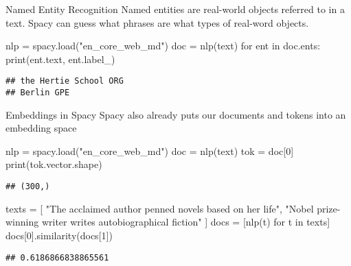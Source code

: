 \documentclass[
  10pt,
  ignorenonframetext,
  aspectratio=169]{beamer}
\newenvironment{Shaded}{\begin{snugshade}}{\end{snugshade}}
\newcommand{\BuiltInTok}[1]{\textcolor[rgb]{0.80,0.80,0.80}{#1}}
\newcommand{\ControlFlowTok}[1]{\textcolor[rgb]{0.94,0.87,0.69}{#1}}
\newcommand{\DecValTok}[1]{\textcolor[rgb]{0.86,0.86,0.80}{#1}}
\newcommand{\KeywordTok}[1]{\textcolor[rgb]{0.94,0.87,0.69}{#1}}
\newcommand{\NormalTok}[1]{\textcolor[rgb]{0.80,0.80,0.80}{#1}}
\newcommand{\OperatorTok}[1]{\textcolor[rgb]{0.94,0.94,0.82}{#1}}
\newcommand{\StringTok}[1]{\textcolor[rgb]{0.80,0.58,0.58}{#1}}
\begin{document}
\begin{frame}[fragile]{Named Entity Recognition}
\protect\hypertarget{named-entity-recognition}{}
Named entities are real-world objects referred to in a text. Spacy can
guess what phrases are what types of real-word objects.

\medskip
\scriptsize

\begin{Shaded}
\begin{Highlighting}[]
\NormalTok{nlp }\OperatorTok{=}\NormalTok{ spacy.load(}\StringTok{"en\_core\_web\_md"}\NormalTok{)}
\NormalTok{doc }\OperatorTok{=}\NormalTok{ nlp(text)}
\ControlFlowTok{for}\NormalTok{ ent }\KeywordTok{in}\NormalTok{ doc.ents:}
    \BuiltInTok{print}\NormalTok{(ent.text, ent.label\_)}
\end{Highlighting}
\end{Shaded}

\begin{verbatim}
## the Hertie School ORG
## Berlin GPE
\end{verbatim}
\end{frame}

\begin{frame}[fragile]{Embeddings in Spacy}
\protect\hypertarget{embeddings-in-spacy}{}
Spacy also already puts our documents and tokens into an embedding space

\medskip
\scriptsize

\begin{Shaded}
\begin{Highlighting}[]
\NormalTok{nlp }\OperatorTok{=}\NormalTok{ spacy.load(}\StringTok{"en\_core\_web\_md"}\NormalTok{)}
\NormalTok{doc }\OperatorTok{=}\NormalTok{ nlp(text)}
\NormalTok{tok }\OperatorTok{=}\NormalTok{ doc[}\DecValTok{0}\NormalTok{]}
\BuiltInTok{print}\NormalTok{(tok.vector.shape)}
\end{Highlighting}
\end{Shaded}

\begin{verbatim}
## (300,)
\end{verbatim}

\begin{Shaded}
\begin{Highlighting}[]
\NormalTok{texts }\OperatorTok{=}\NormalTok{ [}
  \StringTok{"The acclaimed author penned novels based on her life"}\NormalTok{,}
  \StringTok{"Nobel prize{-}winning writer writes autobiographical fiction"}
\NormalTok{]}
\NormalTok{docs }\OperatorTok{=}\NormalTok{ [nlp(t) }\ControlFlowTok{for}\NormalTok{ t }\KeywordTok{in}\NormalTok{ texts]}
\NormalTok{docs[}\DecValTok{0}\NormalTok{].similarity(docs[}\DecValTok{1}\NormalTok{])}
\end{Highlighting}
\end{Shaded}

\begin{verbatim}
## 0.6186866838865561
\end{verbatim}
\end{frame}
\end{document}
